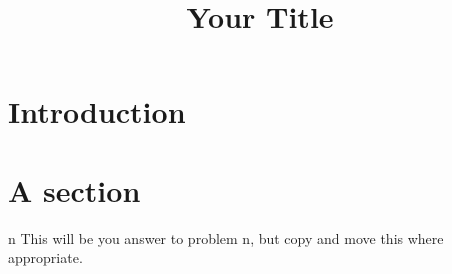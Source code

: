 \documentclass{mm2}
\title{Your Title}
\begin{document}
\begin{abstract}

\end{abstract}



\section{Introduction}


\section{A section}

\begin{answer}{n}
  This will be you answer to problem n, but copy and move this where
  appropriate.
\end{answer}
\end{document}
